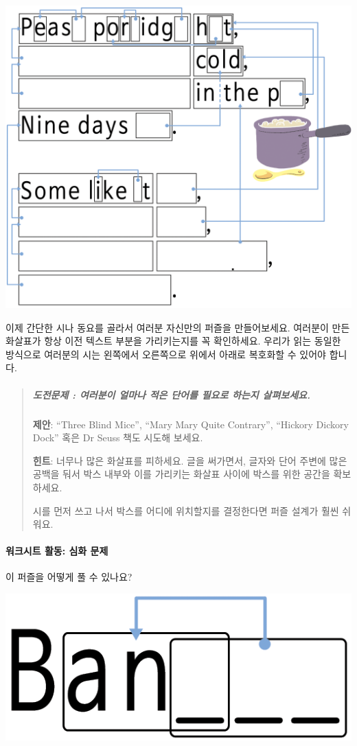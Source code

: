 \documentclass[]{article}
\begin{document}
\includegraphics{csunplugged/01-part/img/ch03-text/03-text-03-peas.png}

이제 간단한 시나 동요를 골라서 여러분 자신만의 퍼즐을 만들어보세요.
여러분이 만든 화살표가 항상 이전 텍스트 부분을 가리키는지를 꼭
확인하세요. 우리가 읽는 동일한 방식으로 여러분의 시는 왼쪽에서
오른쪽으로 위에서 아래로 복호화할 수 있어야 합니다.

\begin{quote}
\mbox{}%
\subparagraph{도전문제 : 여러분이 얼마나 적은 단어를 필요로 하는지
살펴보세요.}\label{section-52}

\textbf{제안}: ``Three Blind Mice'', ``Mary Mary Quite Contrary'',
``Hickory Dickory Dock'' 혹은 Dr Seuss 책도 시도해 보세요.

\textbf{힌트}: 너무나 많은 화살표를 피하세요. 글을 써가면서, 글자와 단어
주변에 많은 공백을 둬서 박스 내부와 이를 가리키는 화살표 사이에 박스를
위한 공간을 확보하세요.

시를 먼저 쓰고 나서 박스를 어디에 위치할지를 결정한다면 퍼즐 설계가 훨씬
쉬워요.
\end{quote}

\mbox{}\paragraph{워크시트 활동: 심화 문제}\label{section-53}

이 퍼즐을 어떻게 풀 수 있나요?

\includegraphics{csunplugged/01-part/img/ch03-text/03-text-04-banana-01.png}
\end{document}
